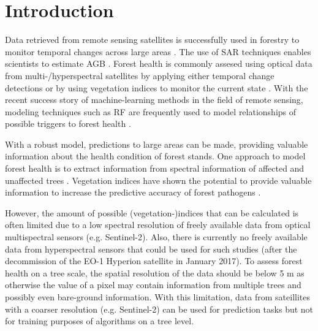 \documentclass[review]{elsarticle}
\begin{document}
\section{Introduction}
\label{sec:intro}

\noindent Data retrieved from remote sensing satellites is successfully used in forestry to monitor temporal changes across large areas \citep{martinezdelcastilloEvaluationForestCover2015,sextonModelPropagationUncertainty2015}.
The use of \ac{SAR} techniques enables scientists to estimate \ac{AGB} \citep{luSurveyRemoteSensingbased2016, sinhaReviewRadarRemote2015}.
Forest health is commonly assesed using optical data from multi-/hyperspectral satellites by applying either temporal change detections \citep{zhangRemoteSensingSeasonal2016} or by using vegetation indices to monitor the current state \citep{townsendGeneralLandsatModel2012}.
With the recent success story of machine-learning methods in the field of remote sensing, modeling techniques such as \ac{RF} are frequently used to model relationships of possible triggers to forest health \citep{belgiuRandomForestRemote2016, laryMachineLearningGeosciences2016, michezClassificationRiparianForest2016}.

With a robust model, predictions to large areas can be made, providing valuable information about the health condition of forest stands.
One approach to model forest health is to extract information from spectral information of affected and unaffected trees \citep{lelongEvaluationOilPalmFungal2010}.
Vegetation indices have shown the potential to provide valuable information to increase the predictive accuracy of forest pathogens \citep{jiangSatellitederivedVegetationIndices2014, adamczykRededgeVegetationIndices2015}.

However, the amount of possible (vegetation-)indices that can be calculated is often limited due to a low spectral resolution of freely available data from optical multispectral sensors (e.g. Sentinel-2).
Also, there is currently no freely available data from hyperspectral sensors that could be used for such studies (after the decommission of the EO-1 Hyperion satellite in January 2017).
To assess forest health on a tree scale, the spatial resolution of the data should be below 5 m as otherwise the value of a pixel may contain information from multiple trees and possibly even bare-ground information.
With this limitation, data from sateillites with a coarser resolution (e.g. Sentinel-2) can be used for prediction tasks but not for training purposes of algorithms on a tree level.
\end{document}
